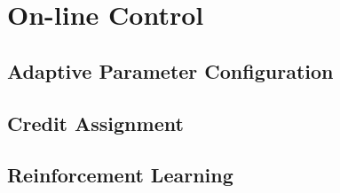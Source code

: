 \section{On-line Control}
\label{sec:oncontrol}

\subsection{Adaptive Parameter Configuration}
\label{subsec:paramadaptive}

\subsection{Credit Assignment}
\label{subsec:creditassign}

\subsection{Reinforcement Learning}
\label{subsec:reinforce}
